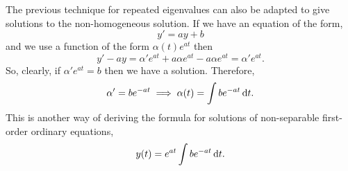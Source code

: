 \documentclass[../MathsNotesBase.tex]{subfiles}
\begin{document}
{	
		\biggerskip
		
		The previous technique for repeated eigenvalues can also be adapted to give solutions to the non-homogeneous solution. If we have an equation of the form,
		\[ y' = a y + b \]
		and we use a function of the form ${ \alpha(t) e^{at} }$ then
		\[ y' - ay = \alpha' e^{at} + a \alpha e^{at} - a \alpha e^{at} = \alpha' e^{at}. \]
		So, clearly, if ${ \alpha' e^{at} = b }$ then we have a solution. Therefore,
		\[ \alpha' = b e^{-at} \implies \alpha(t) = \int b e^{-at} \dif t. \]
		This is another way of deriving the formula for solutions of non-separable first-order ordinary equations,
		\[ y(t) = e^{at} \int b e^{-at} \dif t. \]
		
	}
\end{document}
